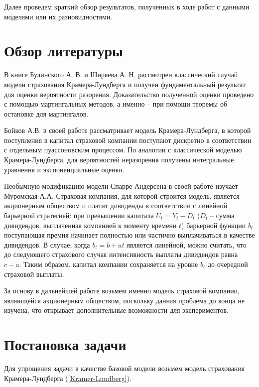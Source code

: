 \documentclass{article}
\theoremstyle{plain}
\theoremstyle{plain}
\theoremstyle{plain}
\theoremstyle{plain}
\theoremstyle{definition}
\theoremstyle{remark}
\begin{document}
Далее проведем краткий обзор результатов, полученных в ходе работ с данными моделями или их разновидностями.
    
\section{Обзор литературы}

В книге Булинского А. В. и Ширяева А. Н. \cite{Shiryaev_stochastic} рассмотрен классический случай модели страхования Крамера-Лундберга и получен фундаментальный результат для оценки вероятности разорения. Доказательство полученной оценки проведено с помощью мартингальных методов, а именно -- при помощи теоремы об остановке для мартингалов. %

Бойков А.В. в своей работе \cite{KL_premium} рассматривает модель Крамера-Лундберга, в которой поступления в капитал страховой компании поступают дискретно в соответствии с отдельным пуассоновским процессом. По аналогии с классической моделью Крамера-Лундберга, для вероятностей неразорения получены интегральные уравнения и экспоненциальные оценки.

Необычную модификацию модели Спарре-Андерсена в своей работе \cite{SA_dividends} изучает Муромская А.А. Страховая компания, для которой строится модель, является акционерным обществом и платит дивиденды в соответствии с линейной барьерной стратегией: при превышении капитала $U_t = Y_t - D_t$ ($D_t$ -- сумма дивидендов, выплаченная компанией к моменту времени $t$) барьерной функции $b_t$ поступающая премия начинает полностью или частично выплачиваться в качестве дивидендов. В случае, когда $b_t = b + at$ является линейной, можно считать, что до следующего страхового случая интенсивность выплаты дивидендов равна $c - a$. Таким образом, капитал компании сохраняется на уровне $b_t$ до очередной страховой выплаты.

За основу в дальнейшей работе возьмем именно модель страховой компании, являющейся акционерным обществом, поскольку данная проблема до конца не изучена, что открывает дополнительные возможности для экспериментов.

\section{Постановка задачи}
\label{Problem_Description}

Для упрощения задачи в качестве базовой модели возьмем модель страхования Крамера-Лундберга (\ref{Kramer-Lundberg}).
\end{document}
